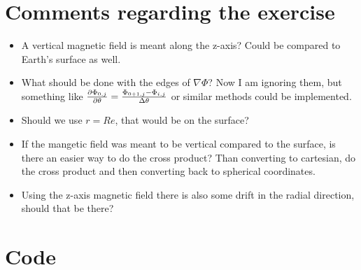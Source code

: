 \documentclass[x11names]{article}
\begin{document}
\appendix
\section{Comments regarding the exercise}
    \begin{itemize}
      \item A vertical magnetic field is meant along the z-axis? Could be compared to Earth's surface as well.
      \item What should be done with the edges of \(\nabla \Phi\)? Now I am ignoring them, but something like \( \pdv{\Phi_{0,j}}{\theta} = \frac{ \Phi_{0+1, j} - \Phi_{i, j} }{\Delta \theta}\) or similar methods could be implemented.
      \item Should we use \(r = Re\), that would be on the surface?
      \item If the mangetic field was meant to be vertical compared to the surface, is there an easier way to do the cross product? Than converting to cartesian, do the cross product and then converting back to spherical coordinates.
      \item Using the z-axis magnetic field there is also some drift in the radial direction, should that be there?
    \end{itemize}


\section{Code}
  \label{sec:code}
  
\end{document}

